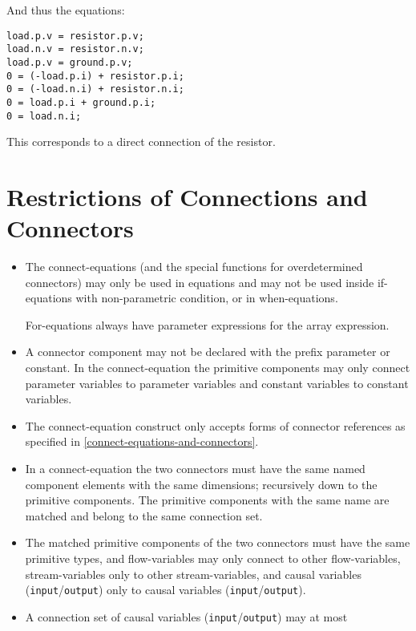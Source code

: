 \begin{example}
And thus the equations:
\begin{lstlisting}[language=modelica]
load.p.v = resistor.p.v;
load.n.v = resistor.n.v;
load.p.v = ground.p.v;
0 = (-load.p.i) + resistor.p.i;
0 = (-load.n.i) + resistor.n.i;
0 = load.p.i + ground.p.i;
0 = load.n.i;
\end{lstlisting}

This corresponds to a direct connection of the resistor.
\end{example}

\section{Restrictions of Connections and Connectors}\label{restrictions-of-connections-and-connectors}

\begin{itemize}
\item
  The connect-equations (and the special functions for overdetermined
  connectors) may only be used in equations and may not be used inside
  if-equations with non-parametric condition, or in when-equations.
  \begin{nonnormative}
  For-equations always have parameter expressions for the array expression.
  \end{nonnormative}
\item
  A connector component may not be declared with the prefix parameter or
  constant. In the connect-equation the primitive components may only
  connect parameter variables to parameter variables and constant
  variables to constant variables.
\item
  The connect-equation construct only accepts forms of connector
  references as specified in \cref{connect-equations-and-connectors}.
\item
  In a connect-equation the two connectors must have the same named
  component elements with the same dimensions; recursively down to the
  primitive components. The primitive components with the same name are
  matched and belong to the same connection set.
\item
  The matched primitive components of the two connectors must have the
  same primitive types, and flow-variables may only connect to other
  flow-variables, stream-variables only to other stream-variables, and
  causal variables (\lstinline!input!/\lstinline!output!) only to causal variables
  (\lstinline!input!/\lstinline!output!).
\item
  A connection set of causal variables (\lstinline!input!/\lstinline!output!) may at most

\end{itemize}
